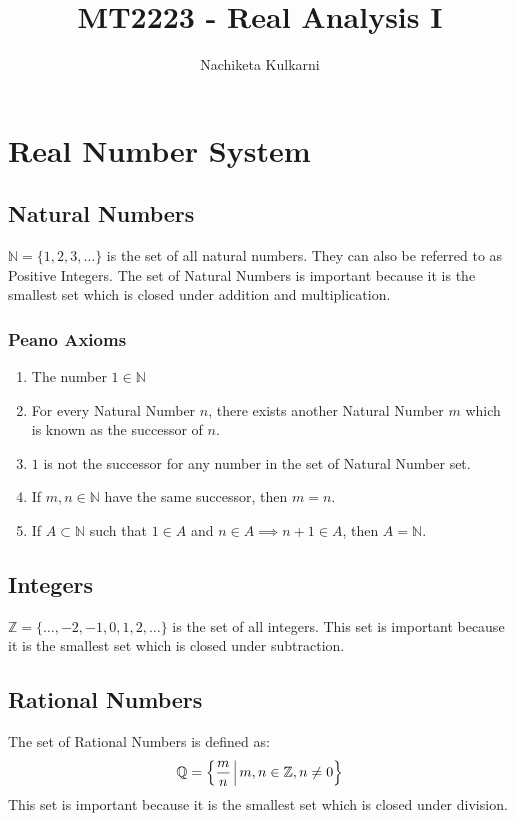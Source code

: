 \documentclass[12pt, oneside]{book}
\date{}
\title{MT2223 - Real Analysis I}
\author{Nachiketa Kulkarni}
\begin{document}
\maketitle
\tableofcontents

\mainmatter
\chapter{Real Number System}
\section{Natural Numbers}
\( \mathbb{N} = \{ 1,2,3,\dots \} \) is the set of all natural numbers.
They can also be referred to as Positive Integers.
The set of Natural Numbers is important because it is the smallest set which is closed under addition and multiplication.

\subsection{Peano Axioms}
\begin{enumerate}
    \item The number \(1 \in \mathbb{N}\)
    \item For every Natural Number \(n\), there exists another Natural Number \(m\) which is known as the successor of \(n\).
    \item \(1\) is not the successor for any number in the set of Natural Number set.
    \item If \(m,n \in \mathbb{N}\) have the same successor, then \(m=n\).
    \item If \(A \subset \mathbb{N}\) such that \(1 \in A\) and \(n \in A \implies n+1 \in A\), then \(A = \mathbb{N}\).
\end{enumerate}

\section{Integers}
\( \mathbb{Z} = \{ \dots, -2, -1, 0, 1, 2, \dots \} \) is the set of all integers.
This set is important because it is the smallest set which is closed under subtraction.

\section{Rational Numbers}
The set of Rational Numbers is defined as:
\[ \mathbb{Q} = \left\{ \frac{m}{n} \; \vline \; m,n \in \mathbb{Z}, n \neq 0 \right\} \]
This set is important because it is the smallest set which is closed under division.
\end{document}
